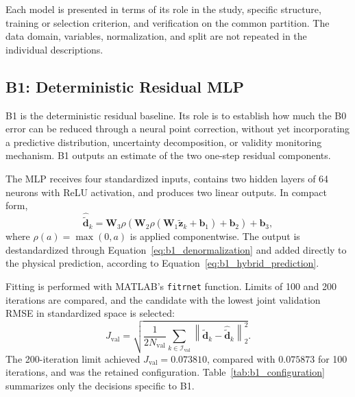 \documentclass[12pt,a4paper]{report}
\begin{document}
Each model is presented in terms of its role in the study, specific structure, training or selection criterion, and verification on the common partition. The data domain, variables, normalization, and split are not repeated in the individual descriptions.

\subsection{B1: Deterministic Residual MLP}
\label{sec:modelo_b1}

B1 is the deterministic residual baseline. Its role is to establish how much the B0 error can be reduced through a neural point correction, without yet incorporating a predictive distribution, uncertainty decomposition, or validity monitoring mechanism. B1 outputs an estimate of the two one-step residual components.

The MLP receives four standardized inputs, contains two hidden layers of 64 neurons with ReLU activation, and produces two linear outputs. In compact form,
\begin{equation}
    \hat{\tilde{\mathbf{d}}}_k
    =
    \mathbf{W}_3
    \rho\!\left(
        \mathbf{W}_2
        \rho\!\left(
            \mathbf{W}_1\tilde{\mathbf{z}}_k+\mathbf{b}_1
        \right)
        +\mathbf{b}_2
    \right)
    +\mathbf{b}_3,
    \label{eq:b1_mlp_mapping}
\end{equation}
where $\rho(a)=\max(0,a)$ is applied componentwise. The output is destandardized through Equation~\eqref{eq:b1_denormalization} and added directly to the physical prediction, according to Equation~\eqref{eq:b1_hybrid_prediction}.

Fitting is performed with MATLAB's \texttt{fitrnet} function. Limits of 100 and 200 iterations are compared, and the candidate with the lowest joint validation RMSE in standardized space is selected:
\begin{equation}
    J_{\mathrm{val}}
    =
    \sqrt{
        \frac{1}{2N_{\mathrm{val}}}
        \sum_{k\in\mathcal{I}_{\mathrm{val}}}
        \left\|
            \tilde{\mathbf{d}}_k
            -
            \hat{\tilde{\mathbf{d}}}_k
        \right\|_2^2
    }.
    \label{eq:b1_validation_score}
\end{equation}
The 200-iteration limit achieved $J_{\mathrm{val}}=0.073810$, compared with $0.075873$ for 100 iterations, and was the retained configuration. Table~\ref{tab:b1_configuration} summarizes only the decisions specific to B1.
\end{document}
